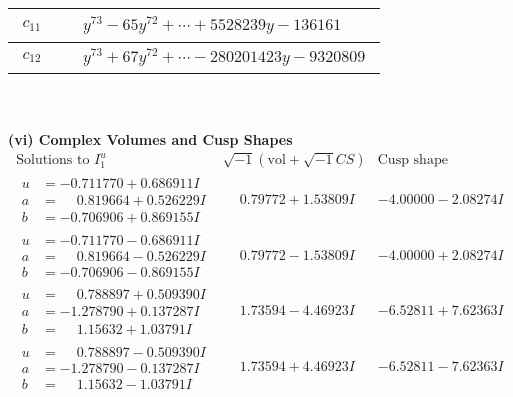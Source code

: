 \documentclass[1p]{elsarticle_modified}
\theoremstyle{definition}
\newcommand{\I}{\sqrt{-1}}
\begin{document}
\begin{tabular}{m{50pt}|m{274pt}}
\hline $$\begin{aligned}c_{11}\end{aligned}$$&$\begin{aligned}
&y^{73}-65 y^{72}+\cdots+5528239 y-136161
\end{aligned}$\\
\hline $$\begin{aligned}c_{12}\end{aligned}$$&$\begin{aligned}
&y^{73}+67 y^{72}+\cdots-280201423 y-9320809
\end{aligned}$\\
\hline
\end{tabular}\\~\\
\newpage\flushleft \textbf{(vi) Complex Volumes and Cusp Shapes}
$$\begin{array}{c|c|c}  
\text{Solutions to }I^u_{1}& \I (\text{vol} + \sqrt{-1}CS) & \text{Cusp shape}\\
 \hline 
\begin{aligned}
u &= -0.711770 + 0.686911 I \\
a &= \phantom{-}0.819664 + 0.526229 I \\
b &= -0.706906 + 0.869155 I\end{aligned}
 & \phantom{-}0.79772 + 1.53809 I & -4.00000 - 2.08274 I \\ \hline\begin{aligned}
u &= -0.711770 - 0.686911 I \\
a &= \phantom{-}0.819664 - 0.526229 I \\
b &= -0.706906 - 0.869155 I\end{aligned}
 & \phantom{-}0.79772 - 1.53809 I & -4.00000 + 2.08274 I \\ \hline\begin{aligned}
u &= \phantom{-}0.788897 + 0.509390 I \\
a &= -1.278790 + 0.137287 I \\
b &= \phantom{-}1.15632 + 1.03791 I\end{aligned}
 & \phantom{-}1.73594 - 4.46923 I & -6.52811 + 7.62363 I \\ \hline\begin{aligned}
u &= \phantom{-}0.788897 - 0.509390 I \\
a &= -1.278790 - 0.137287 I \\
b &= \phantom{-}1.15632 - 1.03791 I\end{aligned}
 & \phantom{-}1.73594 + 4.46923 I & -6.52811 - 7.62363 I \\ \hline\begin{aligned}

\end{aligned}
\end{array}$$
\end{document}
